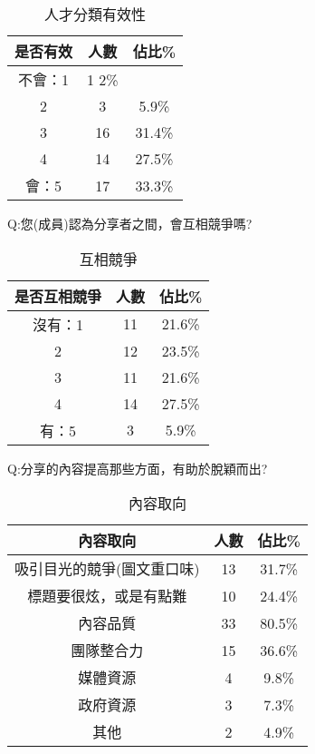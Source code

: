\begin{center} 
\begin{table}[h]
\centering
\caption{人才分類有效性}
\label{4_1_classify_force}
\begin{tabular}{ccc} \hline
是否有效&	人數 &	佔比\% \\ \hline
不會：1&	1	2\% \\ \hline
2	&3	&5.9\% \\ \hline
3	&16&	31.4\% \\ \hline
4	&14	&27.5\% \\ \hline
會：5&	17	&33.3\% \\ \hline

\end{tabular}
\end{table}
\end{center}




Q:您(成員)認為分享者之間，會互相競爭嗎?

\begin{center} 
\begin{table}[h]
\centering
\caption{互相競爭}
\label{4_1_competive}
\begin{tabular}{ccc} \hline
是否互相競爭&	人數 &	佔比\% \\ \hline
沒有：1&	11&	21.6\% \\ \hline
2	&12	&23.5\% \\ \hline
3	&11	&21.6\% \\ \hline
4	&14	&27.5\% \\ \hline
有：5	&3&	5.9\% \\ \hline

\end{tabular}
\end{table}
\end{center}



Q:分享的內容提高那些方面，有助於脫穎而出?

\begin{center} 
\begin{table}[h]
\centering
\caption{內容取向}
\label{4_1_aspect}
\begin{tabular}{ccc} \hline
內容取向&	人數 &	佔比\% \\ \hline
吸引目光的競爭(圖文重口味)&	13&	31.7\% \\ \hline
標題要很炫，或是有點難&	10&	24.4\% \\ \hline
內容品質&	33&	80.5\% \\ \hline
團隊整合力&	15&	36.6\% \\ \hline
媒體資源&	4&	9.8\% \\ \hline
政府資源&	3&	7.3\% \\ \hline
其他	&2&	4.9\% \\ \hline
\end{tabular}
\end{table}
\end{center}


